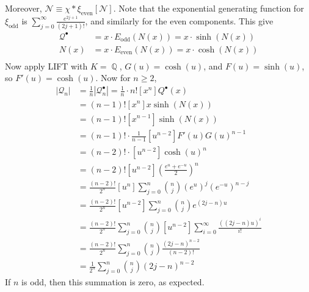 \documentclass[11pt, a4paper]{memoir}
\DeclareMathOperator{\Q}{{\mathbb{Q}}}
\theoremstyle{change}
\theoremstyle{plain}
\theoremstyle{nonumberplain}
\numberwithin{equation}{section}
\begin{document}
Moreover, $\mathcal{N}\equiv\chi *\xi_{\text{even}}[\mathcal{N}]$.
Note that the exponential generating function for $\xi_{\text{odd}}$ is $\sum_{j=0}^\infty\frac{e^{2j+1}}{(2j+1)!}$, and similarly for the even components.
This give
\begin{align*}
    \mathcal{Q}^\bullet &= x\cdot E_{\text{odd}}(N(x))=x\cdot\sinh(N(x))\\
    N(x) &= x\cdot E_{\text{even}}(N(x))=x\cdot\cosh(N(x))\\
\end{align*}
Now apply LIFT with $K=\Q$, $G(u)=\cosh(u)$, and $F(u)=\sinh(u)$, so $F'(u)=\cosh(u)$.
Now for $n\geq 2$,
\begin{align*}
    |\mathcal{Q}_n|&=\frac{1}{n}|\mathcal{Q}^\bullet_n|=\frac{1}{n}\cdot n![x^n]Q^\bullet(x)\\
                   &= (n-1)![x^n]x\sinh(N(x))\\
                   &= (n-1)![x^{n-1}]\sinh(N(x))\\
                   &= (n-1)!\cdot\frac{1}{n-1}[u^{n-2}]F'(u)G(u)^{n-1}\\
                   &= (n-2)!\cdot[u^{n-2}]\cosh(u)^n\\
                   &= (n-2)![u^{n-2}]\left(\frac{e^u+e^{-u}}{2}\right)^n\\
                   &= \frac{(n-2)!}{2^n}[u^n]\sum_{j=0}^n\binom{n}{j}(e^u)^j(e^{-u})^{n-j}\\
                   &= \frac{(n-2)!}{2^n}[u^{n-2}]\sum_{j=0}^n\binom{n}{j}e^{(2j-n)u}\\
                   &= \frac{(n-2)!}{2^n}\sum_{j=0}^n\binom{n}{j}[u^{n-2}]\sum_{i=0}^\infty\frac{((2j-n)u)^i}{i!}\\
                   &= \frac{(n-2)!}{2^n}\sum_{j=0}^n\binom{n}{j}\frac{(2j-n)^{n-2}}{(n-2)!}\\
                   &= \frac{1}{2^n}\sum_{j=0}^n\binom{n}{j}(2j-n)^{n-2}
\end{align*}
If $n$ is odd, then this summation is zero, as expected.
\end{document}
